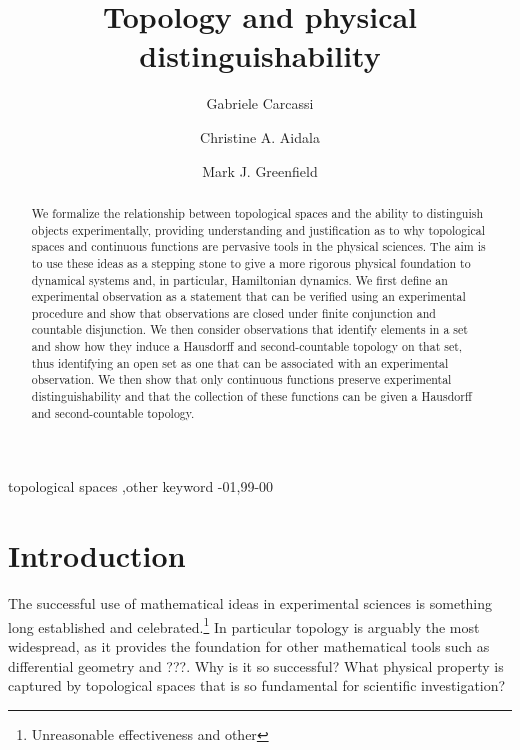 \documentclass[review]{elsarticle}
\theoremstyle{plain}%
\theoremstyle{definition}
\theoremstyle{remark}
\begin{document}
\begin{frontmatter}

\title{Topology and physical distinguishability}

\author[]{Gabriele Carcassi}

\author[]{Christine A. Aidala}

\author[]{Mark J. Greenfield}

\address{University of Michigan, Ann Arbor, MI 48109, USA}



\begin{abstract}
We formalize the relationship between topological spaces and the ability to distinguish objects experimentally, providing understanding and justification as to why topological spaces and continuous functions are pervasive tools in the physical sciences. The aim is to use these ideas as a stepping stone to give a more rigorous physical foundation to dynamical systems and, in particular, Hamiltonian dynamics.  We first define an experimental observation as a statement that can be verified using an experimental procedure and show that observations are closed under finite conjunction and countable disjunction. We then consider observations that identify elements in a set and show how they induce a Hausdorff and second-countable topology on that set, thus identifying an open set as one that can be associated with an experimental observation. We then show that only continuous functions preserve experimental distinguishability and that the collection of these functions can be given a Hausdorff and second-countable topology. 


\end{abstract}

\begin{keyword}
topological spaces \sep other keyword
-01\sep  99-00
\end{keyword}

\end{frontmatter}

\linenumbers

\section{Introduction}

The successful use of mathematical ideas in experimental sciences is something long established and celebrated.\footnote{Unreasonable effectiveness and other} In particular topology is arguably the most widespread, as it provides the foundation for other mathematical tools such as differential geometry and ???. Why is it so successful? What physical property is captured by topological spaces that is so fundamental for scientific investigation? 
\end{document}
